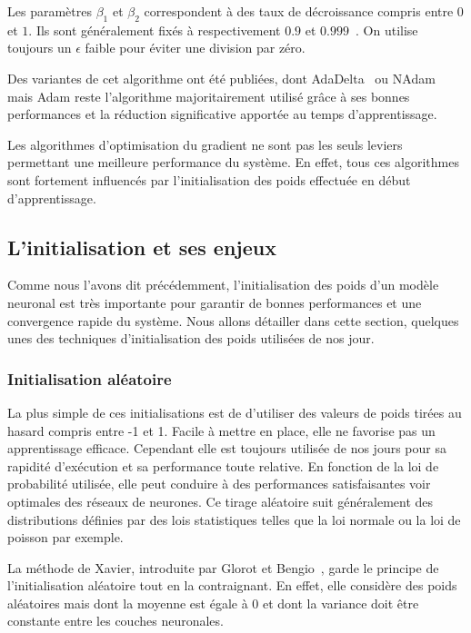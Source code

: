 Les paramètres $\beta_{1}$ et $\beta_{2}$ correspondent à des taux de décroissance compris entre $0$ et $1$. Ils sont généralement fixés à respectivement $0.9$ et $0.999$~\cite{Kingma2015}. On utilise toujours un $\epsilon$ faible pour éviter une division par zéro.

Des variantes de cet algorithme ont été publiées, dont AdaDelta~\cite{Zeiler2012} ou NAdam~\cite{Dozat2016} mais Adam reste l'algorithme majoritairement utilisé grâce à ses bonnes performances et la réduction significative apportée au temps d'apprentissage.

Les algorithmes d'optimisation du gradient ne sont pas les seuls leviers permettant une meilleure performance du système. En effet, tous ces algorithmes sont fortement influencés par l’initialisation des poids effectuée en début d'apprentissage.

\subsection{L'initialisation et ses enjeux}
Comme nous l'avons dit précédemment, l'initialisation des poids d'un modèle neuronal est très importante pour garantir de bonnes performances et une convergence rapide du système. Nous allons détailler dans cette section, quelques unes des techniques d'initialisation des poids utilisées de nos jour.


\subsubsection{Initialisation aléatoire}
La plus simple de ces initialisations est de d’utiliser des valeurs de poids tirées au hasard compris entre -1 et 1. Facile à mettre en place, elle ne favorise pas un apprentissage efficace. Cependant elle est toujours utilisée de nos jours pour sa rapidité d'exécution et sa performance toute relative. En fonction de la loi de probabilité utilisée, elle peut conduire à des performances satisfaisantes voir optimales des réseaux de neurones. Ce tirage aléatoire suit généralement des distributions définies par des lois statistiques telles que la loi normale ou la loi de poisson par exemple.

La méthode de Xavier, introduite par Glorot et Bengio~\cite{Glorot2010}, garde le principe de l'initialisation aléatoire tout en la contraignant. En effet, elle considère des poids aléatoires mais dont la moyenne est égale à $0$ et dont la variance doit être constante entre les couches neuronales.

